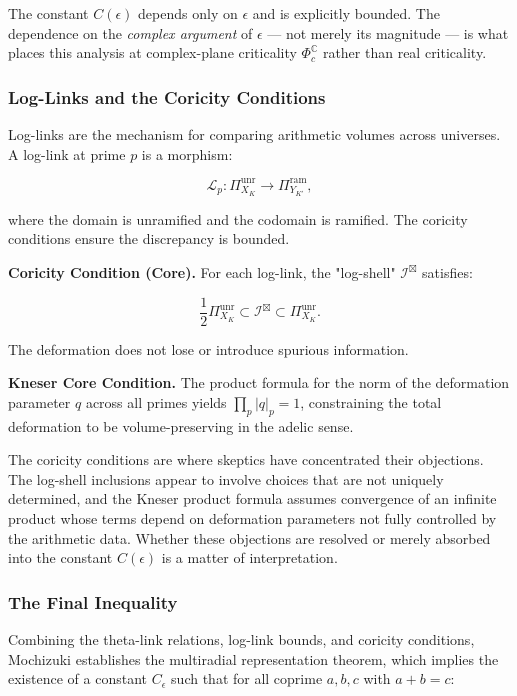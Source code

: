 \documentclass[12pt,a4paper]{article}
\begin{document}
The constant $C(\epsilon)$ depends only on $\epsilon$ and is explicitly bounded. The dependence on the \emph{complex argument} of $\epsilon$ --- not merely its magnitude --- is what places this analysis at complex-plane criticality $\Phi_c^\mathbb{C}$ rather than real criticality.

\subsubsection{Log-Links and the Coricity Conditions}

Log-links are the mechanism for comparing arithmetic volumes across universes. A log-link at prime $p$ is a morphism:

\[\mathcal{L}_p: \Pi^{\text{unr}}_{X_K} \to \Pi^{\text{ram}}_{Y_{K'}},\]

where the domain is unramified and the codomain is ramified. The coricity conditions ensure the discrepancy is bounded.

\textbf{Coricity Condition (Core).} For each log-link, the "log-shell" $\mathcal{I}^\boxtimes$ satisfies:

\[\frac{1}{2} \Pi^{\text{unr}}_{X_K} \subset \mathcal{I}^\boxtimes \subset \Pi^{\text{unr}}_{X_K}.\]

The deformation does not lose or introduce spurious information.

\textbf{Kneser Core Condition.} The product formula for the norm of the deformation parameter $q$ across all primes yields $\prod_p |q|_p = 1$, constraining the total deformation to be volume-preserving in the adelic sense.

The coricity conditions are where skeptics have concentrated their objections. The log-shell inclusions appear to involve choices that are not uniquely determined, and the Kneser product formula assumes convergence of an infinite product whose terms depend on deformation parameters not fully controlled by the arithmetic data. Whether these objections are resolved or merely absorbed into the constant $C(\epsilon)$ is a matter of interpretation.

\subsubsection{The Final Inequality}

Combining the theta-link relations, log-link bounds, and coricity conditions, Mochizuki establishes the multiradial representation theorem, which implies the existence of a constant $C_{\epsilon}$ such that for all coprime $a, b, c$ with $a + b = c$:
\end{document}

